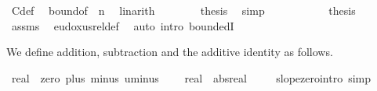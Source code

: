 \begin{isabellebody}
\ C{\isacharprime}{\kern0pt}{\isacharunderscore}{\kern0pt}def\ \isamarkupfalse%
\ bound{\isacharbrackleft}{\kern0pt}of\ {\isachardoublequoteopen}{\isacharminus}{\kern0pt}\ n{\isachardoublequoteclose}{\isacharbrackright}{\kern0pt}\ \isamarkupfalse%
\ linarith\isanewline
\ \ \ \ \ \ \isamarkupfalse%
\ {\isacharquery}{\kern0pt}thesis\ \isamarkupfalse%
\ simp\isanewline
\ \ \ \ \isamarkupfalse%
\isanewline
\ \ \isacommand{{\isacharbraceright}{\kern0pt}}\isamarkupfalse%
\isanewline
\ \ \isamarkupfalse%
\ {\isacharquery}{\kern0pt}thesis\ \isamarkupfalse%
\ assms\ \isamarkupfalse%
\ eudoxus{\isacharunderscore}{\kern0pt}rel{\isacharunderscore}{\kern0pt}def\ \isamarkupfalse%
\ {\isacharparenleft}{\kern0pt}auto\ intro{\isacharcolon}{\kern0pt}\ boundedI{\isacharparenright}{\kern0pt}\isanewline
{}\isamarkupfalse%
%
\endisatagproof
{\isafoldproof}%
%
\isadelimproof
%
\endisadelimproof
%
\isadelimdocument
%
\endisadelimdocument
%
\isatagdocument
%
\isamarkuptrue%
%
\endisatagdocument
{\isafolddocument}%
%
\isadelimdocument
%
\endisadelimdocument
%
\begin{isamarkuptext}%
We define addition, subtraction and the additive identity as follows.%
\end{isamarkuptext}\isamarkuptrue%
\isamarkupfalse%
\ real\ {\isacharcolon}{\kern0pt}{\isacharcolon}{\kern0pt}\ {\isachardoublequoteopen}{\isacharbraceleft}{\kern0pt}zero{\isacharcomma}{\kern0pt}\ plus{\isacharcomma}{\kern0pt}\ minus{\isacharcomma}{\kern0pt}\ uminus{\isacharbraceright}{\kern0pt}{\isachardoublequoteclose}\isanewline
{}\isanewline
\isanewline
{}\isamarkupfalse%
\isanewline
\ \ {\isachardoublequoteopen}{}\ {\isacharcolon}{\kern0pt}{\isacharcolon}{\kern0pt}\ real{\isachardoublequoteclose}\ \ {\isachardoublequoteopen}abs{\isacharunderscore}{\kern0pt}real\ {\isacharparenleft}{\kern0pt}{\isasymlambda}{\isacharunderscore}{\kern0pt}{\isachardot}{\kern0pt}\ {}{\isacharparenright}{\kern0pt}{\isachardoublequoteclose}%
\isadelimproof
\ %
\endisadelimproof
%
\isatagproof
\isacommand{{\isachardot}{\kern0pt}}\isamarkupfalse%
%
\endisatagproof
{\isafoldproof}%
%
\isadelimproof
%
\endisadelimproof
\isanewline
\isanewline
{}\isamarkupfalse%
\ slope{\isacharunderscore}{\kern0pt}zero{\isacharbrackleft}{\kern0pt}intro{\isacharbang}{\kern0pt}{\isacharcomma}{\kern0pt}\ simp{\isacharbrackright}{\kern0pt}\isanewline

\end{isabellebody}

